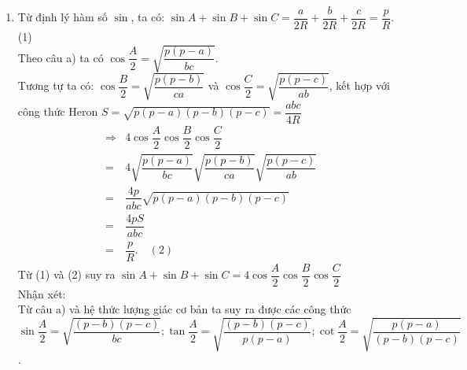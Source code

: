 \begin{bt}
{\begin{enumerate}
            $$
            \cos \dfrac{A}{2}=\cos A D I=\dfrac{D I}{A D}=\dfrac{B D}{2 c}=\sqrt{\dfrac{p(p-a)}{b c}} .
            $$
            Vậy $\cos \dfrac{A}{2}=\sqrt{\dfrac{p(p-a)}{b c}}$.
            \item Từ định lý hàm số $\sin$, ta có: $\sin A+\sin B+\sin C=\dfrac{a}{2 R}+\dfrac{b}{2 R}+\dfrac{c}{2 R}=\dfrac{p}{R}$.\qquad (1)\\
            Theo câu a) ta có $\cos \dfrac{A}{2}=\sqrt{\dfrac{p(p-a)}{b c}}$.\\
            Tương tự ta có: $\cos \dfrac{B}{2}=\sqrt{\dfrac{p(p-b)}{c a}}$ và $\cos \dfrac{C}{2}=\sqrt{\dfrac{p(p-c)}{a b}}$,
            kết hợp với công thức Heron $S=\sqrt{p(p-a)(p-b)(p-c)}=\dfrac{a b c}{4 R}$
            \allowdisplaybreaks
            \begin{eqnarray*}
                &\Rightarrow &4 \cos \dfrac{A}{2} \cos \dfrac{B}{2} \cos \dfrac{C}{2} \\
                &=&4 \sqrt{\dfrac{p(p-a)}{b c}} \sqrt{\dfrac{p(p-b)}{c a}} \sqrt{\dfrac{p(p-c)}{a b}} \\
                &=&\dfrac{4 p}{a b c} \sqrt{p(p-a)(p-b)(p-c)} \\
                &=&\dfrac{4 p S}{a b c}\\
                &=&\dfrac{p}{R}. \quad (2)
            \end{eqnarray*}
            Từ (1) và (2) suy ra $\sin A+\sin B+\sin C=4 \cos \dfrac{A}{2} \cos \dfrac{B}{2} \cos \dfrac{C}{2}$\\
            Nhận xét: \\
            Từ câu a) và hệ thức lượng giác cơ bản ta suy ra được các công thức \break $\sin \dfrac{A}{2}=\sqrt{\dfrac{(p-b)(p-c)}{b c}} ; \tan \dfrac{A}{2}=\sqrt{\dfrac{(p-b)(p-c)}{p(p-a)}} ; \cot \dfrac{A}{2}=\sqrt{\dfrac{p(p-a)}{(p-b)(p-c)}}$.
        \end{enumerate}
        
    }
\end{bt}
